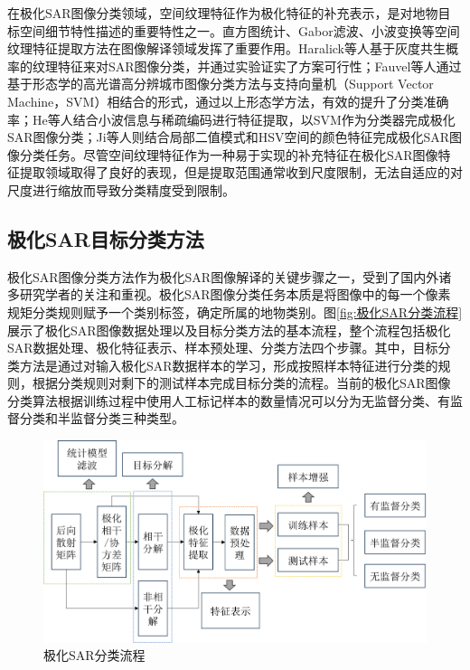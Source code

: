 在极化SAR图像分类领域，空间纹理特征作为极化特征的补充表示，是对地物目标空间细节特性描述的重要特性之一。直方图统计、Gabor滤波、小波变换等空间纹理特征提取方法在图像解译领域发挥了重要作用。Haralick等人基于灰度共生概率的纹理特征来对SAR图像分类，并通过实验证实了方案可行性；Fauvel等人通过基于形态学的高光谱高分辨城市图像分类方法与支持向量机（Support Vector Machine，SVM）相结合的形式，通过以上形态学方法，有效的提升了分类准确率；He等人结合小波信息与稀疏编码进行特征提取，以SVM作为分类器完成极化SAR图像分类；Ji等人则结合局部二值模式和HSV空间的颜色特征完成极化SAR图像分类任务。尽管空间纹理特征作为一种易于实现的补充特征在极化SAR图像特征提取领域取得了良好的表现，但是提取范围通常收到尺度限制，无法自适应的对尺度进行缩放而导致分类精度受到限制。


\subsection{极化SAR目标分类方法}
极化SAR图像分类方法作为极化SAR图像解译的关键步骤之一，受到了国内外诸多研究学者的关注和重视。极化SAR图像分类任务本质是将图像中的每一个像素规矩分类规则赋予一个类别标签，确定所属的地物类别。图\ref{fig:极化SAR分类流程}展示了极化SAR图像数据处理以及目标分类方法的基本流程，整个流程包括极化SAR数据处理、极化特征表示、样本预处理、分类方法四个步骤。其中，目标分类方法是通过对输入极化SAR数据样本的学习，形成按照样本特征进行分类的规则，根据分类规则对剩下的测试样本完成目标分类的流程。当前的极化SAR图像分类算法根据训练过程中使用人工标记样本的数量情况可以分为无监督分类、有监督分类和半监督分类三种类型。

\begin{figure}[h]
  \includegraphics[width=12.3cm]{pic/chapter1/极化SAR分类流程.png}
  \caption{极化SAR分类流程}
  \label{fig:极化SAR图像目标分类流程}
\end{figure}


